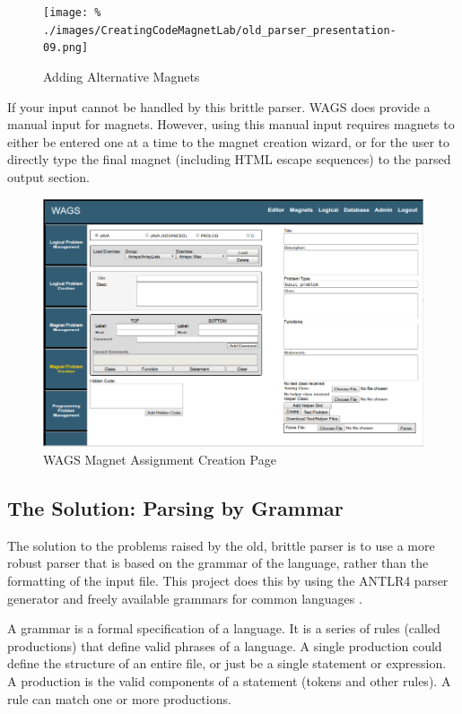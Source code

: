 \documentclass[letter,10pt,final]{article}
\begin{document}
\begin{figure}[h!]
 \centering
 
 \texttt{[image: \%
./images/CreatingCodeMagnetLab/old\_parser\_presentation-09.png]}
 \caption{Adding Alternative Magnets \cite{icer_pres_4_creating_lab}}
 \label{fig:old_parser_alts}
\end{figure}

If your input cannot be handled by this brittle parser. WAGS does 
provide a manual input for magnets. However, using this manual input 
requires magnets to either be entered one at a time to the magnet 
creation wizard, or for the user to directly type the final magnet 
(including HTML escape sequences) to the parsed output section. 

\begin{figure}[h!]
 \centering
 \includegraphics{./images/wags-magnet-creation.png}
 \caption{WAGS Magnet Assignment Creation Page}
 \label{fig:wags-magnet-creation}
\end{figure}


\subsection{The Solution: Parsing by Grammar}

The solution to the problems raised by the old, brittle parser is to 
use a more robust parser that is based on the grammar of the language, 
rather than the formatting of the input file. This project does this by 
using the ANTLR4 parser generator \cite{antlr-reference} and freely 
available grammars for common languages \cite{antlr-grammars-project}.

A grammar is a formal specification of a language. It is a series of 
rules (called productions) that define valid phrases of a language. A 
single production could define the structure of an entire file, or just 
be a single statement or expression. A production is the valid 
components of a statement (tokens and other rules). A rule can match 
one or more productions.
\end{document}
